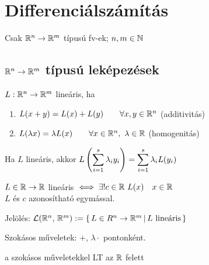 \section{Differenciálszámítás}

\begin{megj} Csak $\mathbb{R}^n\to\mathbb{R}^m$ típusú fv-ek; $n,m\in\mathbb{N}$\end{megj}

\subsection{$\mathbb{R}^n\to\mathbb{R}^m$ típusú leképezések}
\begin{de}
  $L: \mathbb{R}^n\to\mathbb{R}^m$ lineáris, ha
{\listazjromai
\begin{enumerate}
  \item $L(x + y) = L(x) + L(y)\qquad \forall x,y\in \mathbb{R}^n$ (additivitás)
  \item $L(\lambda x) = \lambda L(x)\qquad \forall x\in\mathbb{R}^n,\ \lambda\in\mathbb{R}$ (homogenitás)  
\end{enumerate}
}
\end{de}

\begin{Megj}
\item Ha $L$ lineáris, akkor $\displaystyle L\left(\sum_{i=1}^s \lambda_i y_i\right) = \sum_{i=1}^s\lambda_i L(y_i)$
\item $L\in\mathbb{R}\to\mathbb{R}$ lineáris $\ekviv \exists!c\in \R\ L(x)\quad  x\in\R$\\
  $L$ és $c$ azonosítható egymással.
\item  Jelölés: $\mathcal{L}(\mathbb{R}^n,\,\mathbb{R}^m) :=  \{\,L\in R^n\to\mathbb{R}^m\,|\,L\text{ lineáris}\,\}$
\item  Szokásos műveletek: $+$, $\lambda\cdot$ pontonként.
\end{Megj}

\begin{te}
  \Linearis a szokásos műveletekkel LT az $\mathbb{R}$ felett
\end{te}

